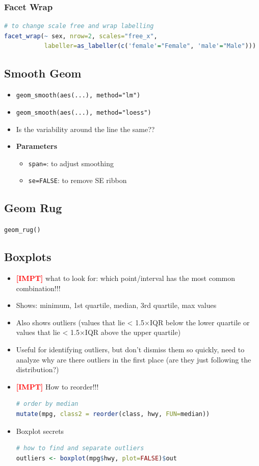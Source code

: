 \documentclass{article}
\newcommand{\impt}[0]{\textcolor{red}{\textbf{[IMPT] }}}
\begin{document}
\begin{multicols}{2}
\subsubsection{Facet Wrap}
\begin{lstlisting}[language=R]
# to change scale free and wrap labelling
facet_wrap(~ sex, nrow=2, scales="free_x",
           labeller=as_labeller(c('female'="Female", 'male'="Male")))
\end{lstlisting}

\subsection{Smooth Geom}
\begin{itemize}
	\item \texttt{geom\_smooth(aes(...), method="lm")}
	\item \texttt{geom\_smooth(aes(...), method="loess")}
	\item Is the variability around the line the same??
	\item \textbf{Parameters}
	\begin{itemize}
		\item \texttt{span=}: to adjust smoothing
		\item \texttt{se=FALSE}: to remove SE ribbon
	\end{itemize}
\end{itemize}

\subsection{Geom Rug}
\texttt{geom\_rug()}

\subsection{Boxplots}
\begin{itemize}
	\item \impt what to look for: which point/interval has the most common combination!!!
	\item Shows: minimum, 1st quartile, median, 3rd quartile, max values
	\item Also shows outliers (values that lie < 1.5$\times$IQR below the lower quartile or values that lie < 1.5$\times$IQR above the upper quartile)
	\item Useful for identifying outliers, but don't dismiss them so quickly, need to analyze why are there outliers in the first place (are they just following the distribution?)
	\item \impt How to reorder!!!
	\begin{lstlisting}[language=R]
		# order by median
mutate(mpg, class2 = reorder(class, hwy, FUN=median))
\end{lstlisting}
    \item Boxplot secrets
    \begin{lstlisting}[language=R]
# how to find and separate outliers
outliers <- boxplot(mpg$hwy, plot=FALSE)$out


\end{lstlisting}
\end{itemize}
\end{multicols}
\end{document}
